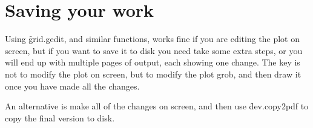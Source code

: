 % 
% 
% 
% 


\section{Saving your work} 
\label{sec:grid-save}

Using \f{grid.gedit}, and similar functions, works fine if you are editing the plot on screen, but if you want to save it to disk you need take some extra steps, or you will end up with multiple pages of output, each showing one change.  The key is not to modify the plot on screen, but to modify the plot grob, and then draw it once you have made all the changes.  

% 
% 


An alternative is make all of the changes on screen, and then use \f{dev.copy2pdf} to copy the final version to disk.


